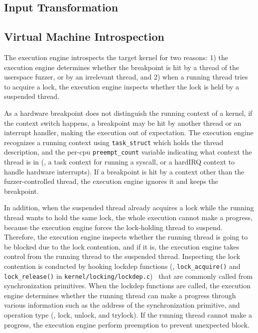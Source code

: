 \subsection{Input Transformation}
\label{s:appendix:inputtransform}



\subsection{Virtual Machine Introspection}
\label{s:appendix:vmi}

The execution engine introspects the target kernel for two reasons: 1)
the execution engine determines whether the breakpoint is hit by a
thread of the userspace fuzzer, or by an irrelevant thread, and 2)
when a running thread tries to acquire a lock, the execution engine
inspects whether the lock is held by a suspended thread.

As a hardware breakpoint does not distinguish the running context of a
kernel, if the context switch happens, a breakpoint may be hit by
another thread or an interrupt handler, making the execution out of
expectation.
%
The execution engine recognizes a running context using
\texttt{task_struct} which holds the thread description, and the
per-cpu \texttt{preempt_count} variable indicating what context the
thread is in (\eg, a task context for running a syscall, or a hardIRQ
context to handle hardware interrupts).
%
If a breakpoint is hit by a context other than the fuzzer-controlled
thread, the execution engine ignores it and keeps the breakpoint.


In addition, when the suspended thread already acquires a lock while
the running thread wants to hold the same lock, the whole execution
cannot make a progress, because the execution engine forces the
lock-holding thread to suspend.
%
Therefore, the execution engine inspects whether the running thread is
going to be blocked due to the lock contention, and if it is, the
execution engine takes control from the running thread to the
suspended thread.
%
Inspecting the lock contention is conducted by hooking lockdep
functions (\ie, \texttt{lock_acquire()} and \texttt{lock_release()} in
\texttt{kernel/locking/lockdep.c})~\cite{lockdep} that are commonly
called from synchronization primitives.
%
When the lockdep functions are called, the execution engine determines
whether the running thread can make a progress through various
information such as the address of the synchronization primitive, and
operation type (\ie, lock, unlock, and trylock).
%
If the running thread cannot make a progress, the execution engine
perform preemption to prevent unexpected block.


